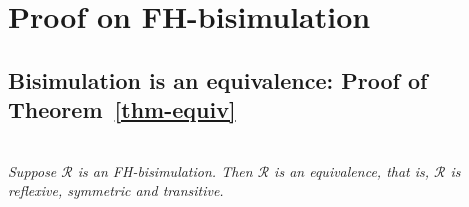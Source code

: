 \documentclass{lmcs}
\begin{document}


% 


\newpage
\appendix    
\section{Proof on FH-bisimulation}
\subsection{Bisimulation is an equivalence: Proof of Theorem~\ref{thm-equiv}}\label{thm-equiv-proof}~\\
        \emph{Suppose $\mathcal{R}$ 
       	is an FH-bisimulation. Then $\mathcal{R}$ is an equivalence, that is, 
       	$\mathcal{R}$ is 
       	reflexive, symmetric and transitive.
       	}
       
\end{document}

